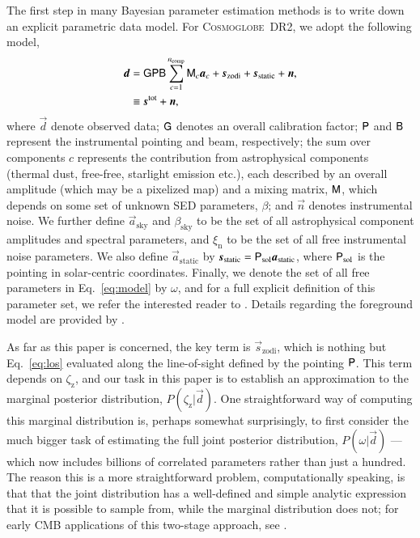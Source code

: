\documentclass[twocolumn]{aa}
\newcommand{\dv}[0]{\vec{d}}
\newcommand{\B}[0]{\tens{B}}
\renewcommand{\G}[0]{\tens{G}}
\newcommand{\n}[0]{\vec{n}}
\newcommand{\s}[0]{\vec{s}}
\renewcommand{\a}[0]{\vec{a}}
\newcommand{\M}[0]{\tens{M}}
\renewcommand{\P}[0]{\tens{P}}
\newcommand{\cosmoglobe}{\textsc{Cosmoglobe}}
\begin{document}
The first step in many Bayesian parameter estimation methods is to
write down an explicit parametric data model. For \cosmoglobe\ DR2, we
adopt the following model,
\begin{align}
	\label{eq:model}
	\dv &=\G\P\B\sum_{c=1}^{n_{\mathrm{comp}}}\M_c\a_c+\s_{\mathrm{zodi}} +
          \s_{\mathrm{static}} + \n,\\
        &\equiv \s^{\mathrm{tot}} + \n,
\end{align}
where $\dv$ denote observed data; $\G$ denotes an overall calibration
factor; $\P$ and $\B$ represent the instrumental pointing and beam,
respectively; the sum over components $c$ represents the contribution
from astrophysical components (thermal dust, free-free, starlight
emission etc.), each described by an overall amplitude (which may be a
pixelized map) and a mixing matrix, $\M$, which depends on some set of
unknown SED parameters, $\beta$; and $\n$ denotes instrumental
noise. We further define $\a_{\mathrm{sky}}$ and
$\beta_{\mathrm{sky}}$ to be the set of all astrophysical component
amplitudes and spectral parameters, and $\xi_{\mathrm{n}}$ to be the
set of all free instrumental noise parameters. We also define
$\a_{\mathrm{static}}$ by
$\s_{\mathrm{static}}=\P_{\mathrm{sol}}\a_{\mathrm{static}}$, where
$\P_{\mathrm{sol}}$ is the pointing in solar-centric
coordinates. Finally, we denote the set of all free parameters in
Eq.~\eqref{eq:model} by $\omega$, and for a full explicit definition
of this parameter set, we refer the interested reader to
\citet{CG02_01}. Details regarding the foreground model are provided
by \citet{CG02_04,CG02_05}.

As far as this paper is concerned, the key term is
$\s_{\mathrm{zodi}}$, which is nothing but Eq.~\eqref{eq:los}
evaluated along the line-of-sight defined by the pointing $\P$. This
term depends on $\zeta_{\mathrm{z}}$, and our task in this paper is to
establish an approximation to the marginal posterior distribution,
$P(\zeta_{\mathrm{z}}|\dv)$. One straightforward way of computing this
marginal distribution is, perhaps somewhat surprisingly, to first
consider the much bigger task of estimating the full joint posterior
distribution, $P(\omega|\dv)$ --- which now includes billions of
correlated parameters rather than just a hundred. The reason this is a 
more straightforward problem, computationally speaking, is that
that the joint distribution has a well-defined and simple analytic expression that it
is possible to sample from, while the marginal distribution does not;
for early CMB applications of this two-stage approach, see
\citet{jewell2004,wandelt2004,eriksen:2004}.
\end{document}
